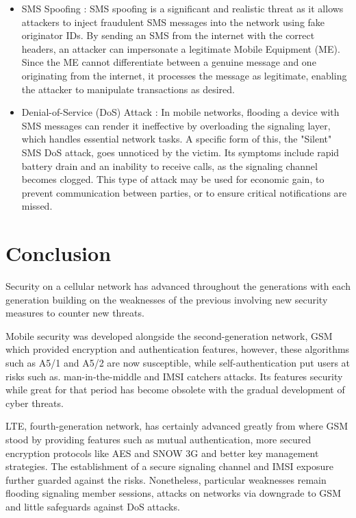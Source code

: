 \documentclass[conference]{IEEEtran}
\begin{document}
\begin{itemize}
\begin{itemize}
    \item SMS Spoofing : SMS spoofing is a significant and realistic threat as it allows attackers to inject fraudulent SMS messages into the network using fake originator IDs.
    By sending an SMS from the internet with the correct headers, an attacker can impersonate a legitimate Mobile Equipment (ME). Since the ME cannot differentiate between a genuine message and one originating from the internet, it processes the message as legitimate, enabling the attacker to manipulate transactions as desired.

    \item Denial-of-Service (DoS) Attack : In mobile networks, flooding a device with SMS messages can render it ineffective by overloading the signaling layer, which handles essential network tasks. 
    A specific form of this, the "Silent" SMS DoS attack, goes unnoticed by the victim. Its symptoms include rapid battery drain and an inability to receive calls, as the signaling channel becomes clogged. 
    This type of attack may be used for economic gain, to prevent communication between parties, or to ensure critical notifications are missed.
 
\end{itemize}
    
\end{itemize}




\section{Conclusion}
Security on a cellular network has advanced throughout the generations with each generation building on the weaknesses of the previous involving new security measures to counter new threats. 

Mobile security was developed alongside the second-generation network, GSM which provided encryption and authentication features, however, these algorithms such as A5/1 and A5/2 are now susceptible, while self-authentication put users at risks such as. man-in-the-middle and IMSI catchers attacks. Its features security while great for that period has become obsolete with the gradual development of cyber threats.

LTE, fourth-generation network, has certainly advanced greatly from where GSM stood by providing features such as mutual authentication, more secured encryption protocols like AES and SNOW 3G and better key management strategies. The establishment of a secure signaling channel and IMSI exposure further guarded against the risks. Nonetheless, particular weaknesses remain flooding signaling member sessions, attacks on networks via downgrade to GSM and little safeguards against DoS attacks.
\end{document}
